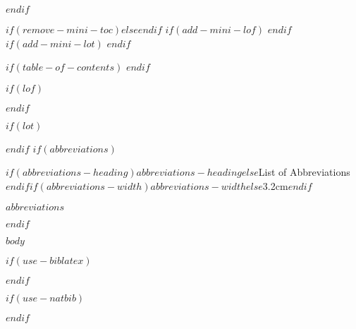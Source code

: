\documentclass[a4paper, $if(page-layout)$$page-layout$$else$nobind$endif$]{templates/ociamthesis}
\begin{document}
\begin{romanpages}
$endif$

$if(remove-mini-toc)$$else$\dominitoc$endif$ %
$if(add-mini-lof)$
  \dominilof  %
$endif$
$if(add-mini-lot)$
  \dominilot  %
$endif$

\flushbottom

$if(table-of-contents)$
\tableofcontents
$endif$

$if(lof)$
\listoffigures
	\mtcaddchapter
$endif$

$if(lot)$
\listoftables
  \mtcaddchapter
$endif$
$if(abbreviations)$
\begin{mclistof}{$if(abbreviations-heading)$$abbreviations-heading$$else$List of Abbreviations$endif$}{$if(abbreviations-width)$$abbreviations-width$$else$3.2cm$endif$}

$abbreviations$

\end{mclistof} 

$endif$

\end{romanpages}

\flushbottom

$body$

$if(use-biblatex)$
\setlength{\baselineskip}{0pt} %

{\renewcommand*\MakeUppercase[1]{#1}%
\printbibliography[heading=none]}

$endif$

$if(use-natbib)$

$endif$
\end{document}
